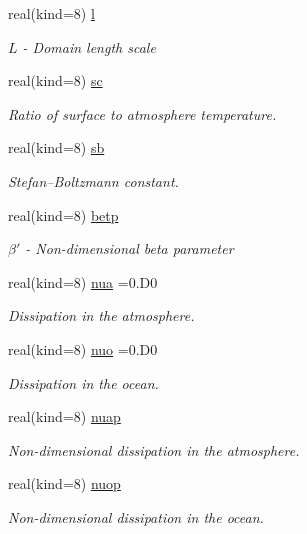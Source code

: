 \begin{DoxyCompactItemize}
real(kind=8) \hyperlink{namespaceparams_aa2b032a17c85d2069ca59212ad8309a1}{l}
\begin{DoxyCompactList}\small\item\em $L$ -\/ Domain length scale \end{DoxyCompactList}\item 
real(kind=8) \hyperlink{namespaceparams_a35c130eb539b9df8c52cc02427913cc0}{sc}
\begin{DoxyCompactList}\small\item\em Ratio of surface to atmosphere temperature. \end{DoxyCompactList}\item 
real(kind=8) \hyperlink{namespaceparams_a7e4a380117958612bc5cf4cac910b483}{sb}
\begin{DoxyCompactList}\small\item\em Stefan–\+Boltzmann constant. \end{DoxyCompactList}\item 
real(kind=8) \hyperlink{namespaceparams_a9ffe87bb8aaab8a0d4f8d5f644b98785}{betp}
\begin{DoxyCompactList}\small\item\em $\beta'$ -\/ Non-\/dimensional beta parameter \end{DoxyCompactList}\item 
real(kind=8) \hyperlink{namespaceparams_a8421c6937257007fb96366980677061c}{nua} =0.D0
\begin{DoxyCompactList}\small\item\em Dissipation in the atmosphere. \end{DoxyCompactList}\item 
real(kind=8) \hyperlink{namespaceparams_a49937b0c51e9f89ac9b2f332d387af2f}{nuo} =0.D0
\begin{DoxyCompactList}\small\item\em Dissipation in the ocean. \end{DoxyCompactList}\item 
real(kind=8) \hyperlink{namespaceparams_a3a0962facf5be13872568dd81f95453c}{nuap}
\begin{DoxyCompactList}\small\item\em Non-\/dimensional dissipation in the atmosphere. \end{DoxyCompactList}\item 
real(kind=8) \hyperlink{namespaceparams_a4802663c55680d2c51142f63636abd2e}{nuop}
\begin{DoxyCompactList}\small\item\em Non-\/dimensional dissipation in the ocean. \end{DoxyCompactList}\item 

\end{DoxyCompactItemize}
